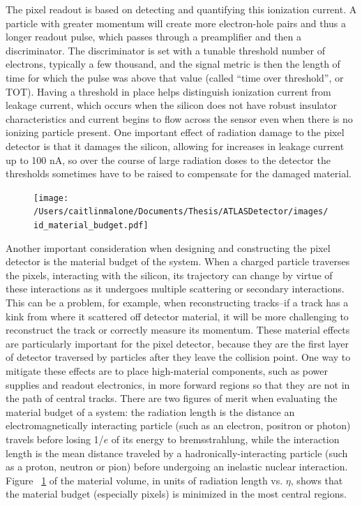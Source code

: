 The pixel readout is based on detecting and quantifying this ionization current.  A particle with greater momentum will create more electron-hole pairs and thus a longer readout pulse, which passes through a preamplifier and then a discriminator.  The discriminator is set with a tunable threshold number of electrons, typically a few thousand, and the signal metric is then the length of time for which the pulse was above that value (called ``time over threshold'', or TOT).  Having a threshold in place helps distinguish ionization current from leakage current, which occurs when the silicon does not have robust insulator characteristics and current begins to flow across the sensor even when there is no ionizing particle present.  One important effect of radiation damage to the pixel detector is that it damages the silicon, allowing for increases in leakage current up to 100 nA, so over the course of large radiation doses to the detector the thresholds sometimes have to be raised to compensate for the damaged material.  


\begin{figure}
  \begin{center}
	\texttt{[image: /Users/caitlinmalone/Documents/Thesis/ATLASDetector/images/id\_material\_budget.pdf]}
	\label{fig:id_material}
	\end{center}
\end{figure}

Another important consideration when designing and constructing the pixel detector is the material budget of the system.  When a charged particle traverses the pixels, interacting with the silicon, its trajectory can change by virtue of these interactions as it undergoes multiple scattering or secondary interactions.  This can be a problem, for example, when reconstructing tracks--if a track has a kink from where it scattered off detector material, it will be more challenging to reconstruct the track or correctly measure its momentum.  These material effects are particularly important for the pixel detector, because they are the first layer of detector traversed by particles after they leave the collision point.  One way to mitigate these effects are to place high-material components, such as power supplies and readout electronics, in more forward regions so that they are not in the path of central tracks.  There are two figures of merit when evaluating the material budget of a system: the radiation length is the distance an electromagnetically interacting particle (such as an electron, positron or photon) travels before losing 1/$e$ of its energy to bremsstrahlung, while the interaction length is the mean distance traveled by a hadronically-interacting particle (such as a proton, neutron or pion) before undergoing an inelastic nuclear interaction.  Figure ~\ref{fig:id_material} of the material volume, in units of radiation length vs. $\eta$, shows that the material budget (especially pixels) is minimized in the most central regions.


